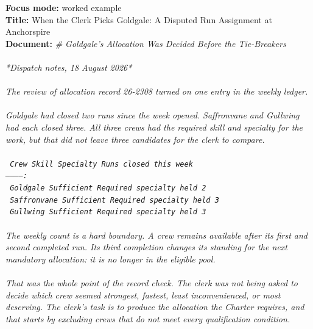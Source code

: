 \documentclass[9pt]{article}
\begin{document}
\begin{minipage}[t]{\textwidth}
\begin{minipage}[t]{0.49\textwidth}
\begin{exbox}
  \textbf{Focus mode:} worked example\\
  \textbf{Title:} When the Clerk Picks Goldgale: A Disputed Run Assignment at Anchorspire\\[3pt]
  \textbf{Document:} \textit{\# Goldgale's Allocation Was Decided Before the Tie-Breakers \\
  \  \\
  {}*Dispatch notes, 18 August 2026* \\
  \  \\
  The review of allocation record 26-2308 turned on one entry in the weekly ledger. \\
  \  \\
  Goldgale had closed two runs since the week opened. Saffronvane and Gullwing had each closed three. All three crews had the required skill and specialty for the work, but that did not leave three candidates for the clerk to compare. \\
  \  \\
  \textup{\texttt{\textbar{} Crew \textbar{} Skill \textbar{} Specialty \textbar{} Runs closed this week \textbar{}}} \\
  \textup{\texttt{\textbar{}---\textbar{}---\textbar{}---\textbar{}---:\textbar{}}} \\
  \textup{\texttt{\textbar{} Goldgale \textbar{} Sufficient \textbar{} Required specialty held \textbar{} 2 \textbar{}}} \\
  \textup{\texttt{\textbar{} Saffronvane \textbar{} Sufficient \textbar{} Required specialty held \textbar{} 3 \textbar{}}} \\
  \textup{\texttt{\textbar{} Gullwing \textbar{} Sufficient \textbar{} Required specialty held \textbar{} 3 \textbar{}}} \\
  \  \\
  The weekly count is a hard boundary. A crew remains available after its first and second completed run. Its third completion changes its standing for the next mandatory allocation: it is no longer in the eligible pool. \\
  \  \\
  That was the whole point of the record check. The clerk was not being asked to decide which crew seemed strongest, fastest, least inconvenienced, or most deserving. The clerk's task is to produce the allocation the Charter requires, and that starts by excluding crews that do not meet every qualification condition. \\
}
\end{exbox}
\end{minipage}
\end{minipage}
\end{document}
